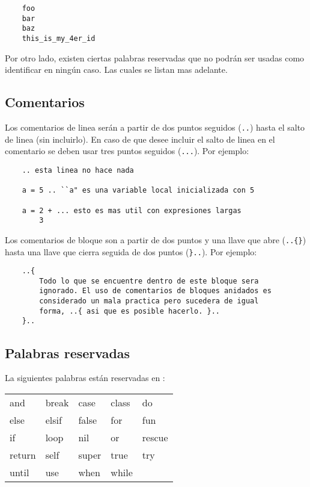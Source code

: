 \documentclass[12pt,letterpaper,titlepage,oneside,openright]{book}
\newcommand{\OhTeX}{%
    \makebox[0.76em][c]{O}%
    \makebox[0.25em][c]{%
        \raisebox{0.14em}[0em][0em]{%
            \fontsize{0.5em}{0cm}%
                \selectfont H%
        }%
    }%
    \makebox[1.35em][c]{\TeX}%
}
\newcommand{\ohtex}{\OhTeX\xspace}
\newcommand{\ttcode}[1]{(\texttt{#1})}
\begin{document}
\begin{center}
\begin{lstlisting}
    foo
    bar
    baz
    this_is_my_4er_id
\end{lstlisting}
\end{center}

Por otro lado, existen ciertas palabras reservadas que no podrán ser usadas como
identificar en ningún caso. Las cuales se listan mas adelante.

\subsection{Comentarios}

Los comentarios de linea serán a partir de dos puntos seguidos \ttcode{..} hasta
el salto de linea (sin incluirlo). En caso de que desee incluir el salto de
linea en el comentario se deben usar tres puntos seguidos \ttcode{...}. Por
ejemplo:

\begin{center}
\begin{lstlisting}
    .. esta linea no hace nada

    a = 5 .. ``a" es una variable local inicializada con 5

    a = 2 + ... esto es mas util con expresiones largas
        3
\end{lstlisting}
\end{center}

Los comentarios de bloque son a partir de dos puntos y una llave que abre
\ttcode{..\{\}} hasta una llave que cierra seguida de dos puntos \ttcode{\}..}. Por
ejemplo:

\begin{center}
\begin{lstlisting}
    ..{
        Todo lo que se encuentre dentro de este bloque sera
        ignorado. El uso de comentarios de bloques anidados es
        considerado un mala practica pero sucedera de igual
        forma, ..{ asi que es posible hacerlo. }..
    }..    
\end{lstlisting}
\end{center}

\subsection{Palabras reservadas}

La siguientes palabras están reservadas en \ohtex:

\begin{center}
\ttfamily
\begin{tabular}{ l l l l l }
and & break & case & class & do \\
else & elsif & false & for & fun \\
if & loop & nil & or & rescue \\
return & self & super & true & try \\
until & use & when & while & \\
\end{tabular}
\end{center}
\end{document}
